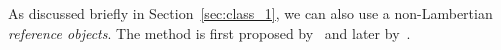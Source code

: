 As discussed briefly in Section~\ref{sec:class_1}, we can also use a non-Lambertian \textit{reference objects}. The method is first proposed by~\citeauthor{silver1980determining} and later by~\citeauthor{hertzmann2005example}.

